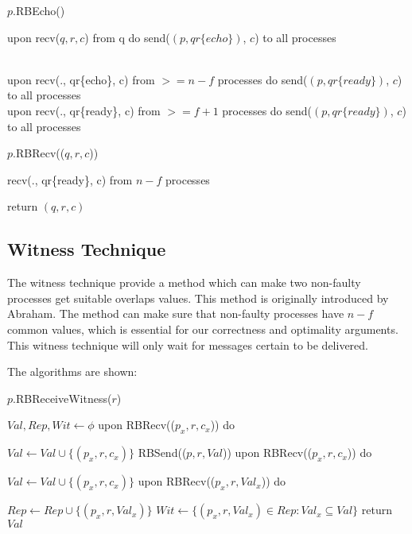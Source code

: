 \begin{algorithm}
\caption{$p$.RBEcho()}
\begin{algorithmic}

    \State upon recv($q, r, c$) from q do
        \State send($(p, qr\{echo\})$, $c$) to all processes
    \EndIf

    \\
    \State upon recv(., qr\{echo\}, c) from $>= n - f$ processes do
        \State send($(p, qr\{ready\})$, $c$) to all processes
    \EndIf
    \\

    \State upon recv(., qr\{ready\}, c) from $>= f + 1$ processes do
        \State send($(p, qr\{ready\})$, $c$) to all processes
    \EndIf
    
\end{algorithmic}
\end{algorithm}

\begin{algorithm}
\caption{$p$.RBRecv(($q,r,c$))}
    recv(., qr\{ready\}, c) from $n - f$ processes

    return $(q, r, c)$

\end{algorithm}

\subsection{Witness Technique}
The witness technique provide a method which can make two non-faulty processes
get suitable overlaps values. This method is originally introduced by Abraham\cite{abraham2004optimal}.
The method can make sure that non-faulty processes have $n - f$ common values, which is 
essential for our correctness and optimality arguments. This witness technique will only
wait for messages certain to be delivered.

The algorithms are shown:

\begin{algorithm}
\caption{$p$.RBReceiveWitness($r$)}
\begin{algorithmic}

    \State $Val, Rep, Wit \leftarrow \phi$
        \State upon RBRecv(($p_{x} , r, c_{x}$)) do

        \hspace{1cm}  $Val \leftarrow Val \cup\{(p_{x}, r, c_{x})\}$
    \EndWhile
    \State RBSend(($p, r, Val$))
        \State upon RBRecv(($p_{x} , r, c_{x}$)) do

        \hspace{1cm}  $Val \leftarrow Val \cup\{(p_{x}, r, c_{x})\}$
        \State upon RBRecv(($p_{x} , r, Val_{x}$)) do

        \hspace{1cm}  $Rep \leftarrow Rep \cup\{(p_{x}, r, Val_{x})\}$
        \State $Wit \leftarrow \{(p_{x}, r, Val_{x}) \in Rep: Val_{x} \subseteq Val\}$
    \EndWhile
    return $Val$
    
\end{algorithmic}
\end{algorithm}
